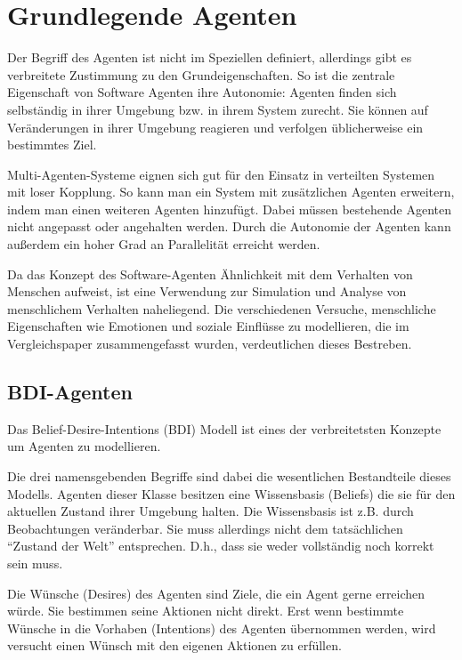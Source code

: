 

\chapter{Grundlegende Agenten}
Der Begriff des Agenten ist nicht im Speziellen definiert, allerdings gibt es verbreitete Zustimmung zu den Grundeigenschaften.
So ist die zentrale Eigenschaft von Software Agenten ihre Autonomie: Agenten finden sich selbständig in ihrer Umgebung bzw. in ihrem System zurecht.
Sie können auf Veränderungen in ihrer Umgebung reagieren und verfolgen üblicherweise ein bestimmtes Ziel\cite{wooldridge2001intelligent}.

Multi-Agenten-Systeme eignen sich gut für den Einsatz in verteilten Systemen mit loser Kopplung.
So kann man ein System mit zusätzlichen Agenten erweitern, indem man einen weiteren Agenten hinzufügt.
Dabei müssen bestehende Agenten nicht angepasst oder angehalten werden.
Durch die Autonomie der Agenten kann außerdem ein hoher Grad an Parallelität erreicht werden.

Da das Konzept des Software-Agenten Ähnlichkeit mit dem Verhalten von Menschen aufweist, ist eine Verwendung zur Simulation und Analyse von menschlichem Verhalten naheliegend.
Die verschiedenen Versuche, menschliche Eigenschaften wie Emotionen und soziale Einflüsse zu modellieren, die im Vergleichspaper zusammengefasst wurden, verdeutlichen dieses Bestreben.

\section{BDI-Agenten}
Das Belief-Desire-Intentions (BDI) Modell\cite{bratman1987intention} ist eines der verbreitetsten Konzepte um Agenten zu modellieren.

Die drei namensgebenden Begriffe sind dabei die wesentlichen Bestandteile dieses Modells.
Agenten dieser Klasse besitzen eine Wissensbasis (Beliefs) die sie für den aktuellen Zustand ihrer Umgebung halten.
Die Wissensbasis ist z.B. durch Beobachtungen veränderbar.
Sie muss allerdings nicht dem tatsächlichen \enquote{Zustand der Welt} entsprechen.
D.h., dass sie weder vollständig noch korrekt sein muss.

Die Wünsche (Desires) des Agenten sind Ziele, die ein Agent gerne erreichen würde.
Sie bestimmen seine Aktionen nicht direkt. 
Erst wenn bestimmte Wünsche in die Vorhaben (Intentions) des Agenten übernommen werden, wird versucht einen Wünsch mit den eigenen Aktionen zu erfüllen.

